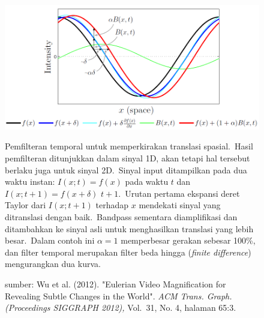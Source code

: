\begin{figure}[ht]
	\vspace{0.5em}
	\centering
	\includegraphics[width=\textwidth]{Sinus}
	\caption[Pemfilteran temporal untuk memperkirakan translasi spasial]{Pemfilteran temporal untuk memperkirakan translasi spasial.~Hasil pemfilteran ditunjukkan dalam sinyal 1D, akan tetapi hal tersebut berlaku juga untuk sinyal 2D.~Sinyal input ditampilkan pada dua waktu instan: \(I(x; t) = f(x)\) pada waktu \(t\) dan \(I(x; t+1) = f(x + \delta)\) \(t+1\).~Urutan pertama ekspansi deret Taylor dari \(I(x; t+1)\) terhadap \(x\) mendekati sinyal yang ditranslasi dengan baik.~Bandpass sementara diamplifikasi dan ditambahkan ke sinyal asli untuk menghasilkan translasi yang lebih besar.~Dalam contoh ini \(\alpha=1\) memperbesar gerakan sebesar 100\%, dan filter temporal merupakan filter beda hingga (\textit{finite difference}) mengurangkan dua kurva.}
	\caption*{sumber: Wu et al. (2012). "Eulerian Video Magnification for Revealing Subtle Changes in the World". \textit{ACM Trans. Graph. (Proceedings SIGGRAPH 2012),} Vol.~31, No. 4, halaman 65:3.}
	\label{fig:Sinus}   
\end{figure}

